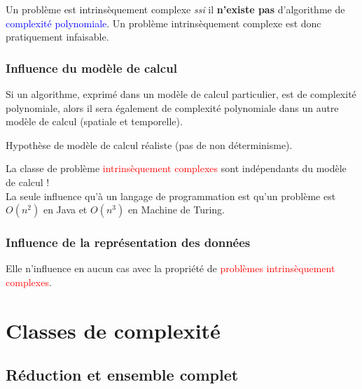 \documentclass{report}
\begin{document}
Un problème est intrinsèquement complexe \textit{ssi} il \textbf{n'existe pas} d'algorithme de \textcolor{blue}{complexité polynomiale}. Un problème intrinsèquement complexe est donc pratiquement infaisable.

\subsection{Influence du modèle de calcul}
Si un algorithme, exprimé dans un modèle de calcul particulier, est de complexité polynomiale, alors il sera également de complexité polynomiale dans un autre modèle de calcul (spatiale et temporelle).\par
Hypothèse de modèle de calcul réaliste (pas de non déterminisme).\par 
La classe de problème \textcolor{red}{intrinsèquement complexes} sont indépendants du modèle de calcul !\\
La seule influence qu'à un langage de programmation est qu'un problème est $O(n^2)$ en Java et $O(n^3)$ en Machine de Turing.

\subsection{Influence de la représentation des données}
Elle n'influence en aucun cas avec la propriété de \textcolor{red}{problèmes intrinsèquement complexes}. 


\chapter{Classes de complexité}
\section{Réduction et ensemble complet}
\end{document}
